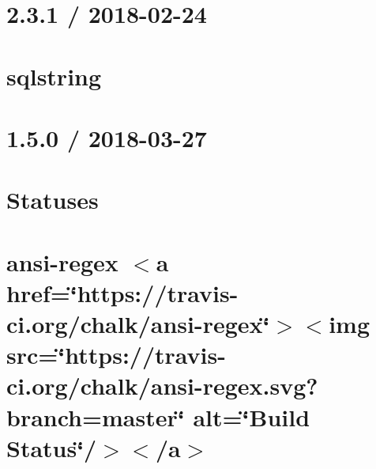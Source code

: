 \let\mypdfximage\pdfximage\def\pdfximage{\immediate\mypdfximage}\documentclass[twoside]{book}
\newcommand{\+}{\discretionary{\mbox{\scriptsize$\hookleftarrow$}}{}{}}
\begin{document}
\chapter{2.3.1 / 2018-\/02-\/24}
\label{md__c_1__git_hub__p_r_o_y_e_c_t_o-_i_i_i-_g_o_t_rest-api_node_modules_sqlstring__h_i_s_t_o_r_y}

\chapter{sqlstring}
\label{md__c_1__git_hub__p_r_o_y_e_c_t_o-_i_i_i-_g_o_t_rest-api_node_modules_sqlstring__r_e_a_d_m_e}

\chapter{1.5.0 / 2018-\/03-\/27}
\label{md__c_1__git_hub__p_r_o_y_e_c_t_o-_i_i_i-_g_o_t_rest-api_node_modules_statuses__h_i_s_t_o_r_y}

\chapter{Statuses}
\label{md__c_1__git_hub__p_r_o_y_e_c_t_o-_i_i_i-_g_o_t_rest-api_node_modules_statuses__r_e_a_d_m_e}

\chapter{ansi-\/regex $<$a href=\char`\"{}https\+://travis-\/ci.\+org/chalk/ansi-\/regex\char`\"{}$>$$<$img src=\char`\"{}https\+://travis-\/ci.\+org/chalk/ansi-\/regex.\+svg?branch=master\char`\"{} alt=\char`\"{}\+Build Status\char`\"{}/$>$$<$/a$>$}
\label{md__c_1__git_hub__p_r_o_y_e_c_t_o-_i_i_i-_g_o_t_rest-api_node_modules_string-width_node_modules_ansi-regex_readme}

\end{document}
